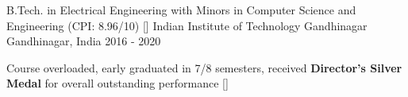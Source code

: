 
\begin{cventries}

  \cventry
    {B.Tech. in Electrical Engineering with Minors in Computer Science and Engineering {(CPI: 8.96/10)} []} %
    {Indian Institute of Technology Gandhinagar} %
    {Gandhinagar, India} %
    {2016 - 2020} %
    {
      \begin{cvitems} %
        \item {Course overloaded, early graduated in 7/8 semesters, received \textbf{Director's Silver Medal} for overall outstanding performance [{}]}
      \end{cvitems}
    }
\vspace{-0.2cm}
\end{cventries}
